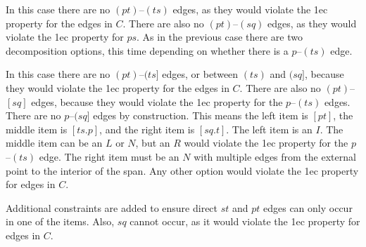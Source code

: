In this case there are no $(pt)$--$(ts)$ edges, as they would violate the 1ec property for the edges in $C$.
There are also no $(pt)$--$(sq)$ edges, as they would violate the 1ec property for $ps$.
As in the previous case there are two decomposition options, this time depending on whether there is a $p$--$(ts)$ edge.

\begin{center}
\end{center}

In this case there are no $(pt)$--$(ts]$ edges, or between $(ts)$ and $(sq]$, because they would violate the 1ec property for the edges in $C$.
There are also no $(pt)$--$[sq]$ edges, because they would violate the 1ec property for the $p$--$(ts)$ edges.
There are no $p$--$(sq]$ edges by construction.
This means the left item is $[pt]$, the middle item is $[ts.p]$, and the right item is $[sq.t]$.
The left item is an $I$.
The middle item can be an $L$ or $N$, but an $R$ would violate the 1ec property for the $p$--$(ts)$ edge.
The right item must be an $N$ with multiple edges from the external point to the interior of the span.
Any other option would violate the 1ec property for edges in $C$.

Additional constraints are added to ensure direct $st$ and $pt$ edges can only occur in one of the items.
Also, $sq$ cannot occur, as it would violate the 1ec property for edges in $C$.


